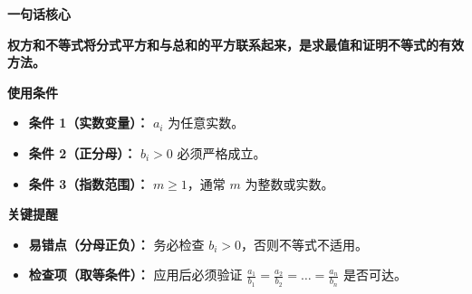 \begin{summarybox}
\textbf{\textcolor{CSummary}{一句话核心}}

\textbf{权方和不等式将分式平方和与总和的平方联系起来，是求最值和证明不等式的有效方法。}

\medskip
\textbf{\textcolor{CSummary}{使用条件}}
\begin{itemize}[leftmargin=*, itemsep=0.5em, topsep=0.4em]
    \item \textbf{条件 1（实数变量）：} $a_i$ 为任意实数。
    \item \textbf{条件 2（正分母）：} $b_i > 0$ 必须严格成立。
    \item \textbf{条件 3（指数范围）：} $m \geq 1$，通常 $m$ 为整数或实数。
\end{itemize}

\medskip
\textbf{\textcolor{CSummary}{关键提醒}}
\begin{itemize}[leftmargin=*, itemsep=0.5em, topsep=0.4em]
    \item \textbf{易错点（分母正负）：} 务必检查 $b_i > 0$，否则不等式不适用。
    \item \textbf{检查项（取等条件）：} 应用后必须验证 $\frac{a_1}{b_1} = \frac{a_2}{b_2} = \dots = \frac{a_n}{b_n}$ 是否可达。
\end{itemize}
\end{summarybox}
